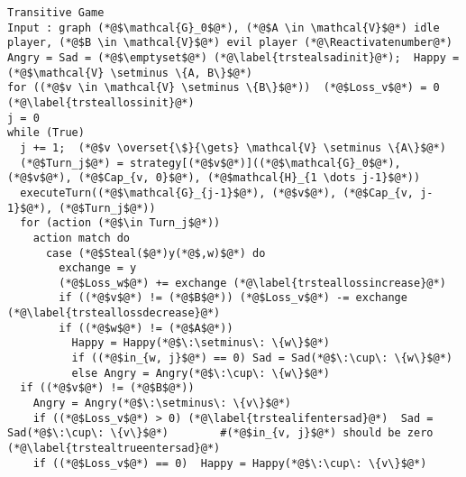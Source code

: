 {}
\Suppressnumber
\begin{lstlisting}[label=transitivegame, style=numbers]
Transitive Game
Input : graph (*@$\mathcal{G}_0$@*), (*@$A \in \mathcal{V}$@*) idle player, (*@$B \in \mathcal{V}$@*) evil player (*@\Reactivatenumber@*)
Angry = Sad = (*@$\emptyset$@*) (*@\label{trstealsadinit}@*);  Happy = (*@$\mathcal{V} \setminus \{A, B\}$@*)
for ((*@$v \in \mathcal{V} \setminus \{B\}$@*))  (*@$Loss_v$@*) = 0 (*@\label{trsteallossinit}@*)
j = 0
while (True)
  j += 1;  (*@$v \overset{\$}{\gets} \mathcal{V} \setminus \{A\}$@*)
  (*@$Turn_j$@*) = strategy[(*@$v$@*)]((*@$\mathcal{G}_0$@*), (*@$v$@*), (*@$Cap_{v, 0}$@*), (*@$mathcal{H}_{1 \dots j-1}$@*))
  executeTurn((*@$\mathcal{G}_{j-1}$@*), (*@$v$@*), (*@$Cap_{v, j-1}$@*), (*@$Turn_j$@*))
  for (action (*@$\in Turn_j$@*))
    action match do
      case (*@$Steal($@*)y(*@$,w)$@*) do
        exchange = y
        (*@$Loss_w$@*) += exchange (*@\label{trsteallossincrease}@*)
        if ((*@$v$@*) != (*@$B$@*)) (*@$Loss_v$@*) -= exchange (*@\label{trsteallossdecrease}@*)
        if ((*@$w$@*) != (*@$A$@*))
          Happy = Happy(*@$\:\setminus\: \{w\}$@*)
          if ((*@$in_{w, j}$@*) == 0) Sad = Sad(*@$\:\cup\: \{w\}$@*)
          else Angry = Angry(*@$\:\cup\: \{w\}$@*)
  if ((*@$v$@*) != (*@$B$@*))
    Angry = Angry(*@$\:\setminus\: \{v\}$@*)
    if ((*@$Loss_v$@*) > 0) (*@\label{trstealifentersad}@*)  Sad = Sad(*@$\:\cup\: \{v\}$@*)        #(*@$in_{v, j}$@*) should be zero (*@\label{trstealtrueentersad}@*)
    if ((*@$Loss_v$@*) == 0)  Happy = Happy(*@$\:\cup\: \{v\}$@*)
\end{lstlisting}
